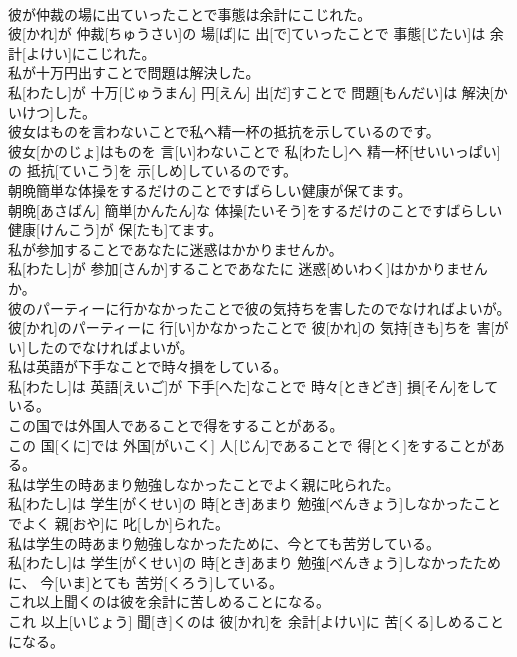 \documentclass[8pt]{extreport}
\begin{document}
\begin{CJK}{UTF8}{min}
\\	彼が仲裁の場に出ていったことで事態は余計にこじれた。	
\\	彼[かれ]が 仲裁[ちゅうさい]の 場[ば]に 出[で]ていったことで 事態[じたい]は 余計[よけい]にこじれた。
\\	私が十万円出すことで問題は解決した。	
\\	私[わたし]が 十万[じゅうまん] 円[えん] 出[だ]すことで 問題[もんだい]は 解決[かいけつ]した。
\\	彼女はものを言わないことで私へ精一杯の抵抗を示しているのです。	
\\	彼女[かのじょ]はものを 言[い]わないことで 私[わたし]へ 精一杯[せいいっぱい]の 抵抗[ていこう]を 示[しめ]しているのです。
\\	朝晩簡単な体操をするだけのことですばらしい健康が保てます。	
\\	朝晩[あさばん] 簡単[かんたん]な 体操[たいそう]をするだけのことですばらしい 健康[けんこう]が 保[たも]てます。
\\	私が参加することであなたに迷惑はかかりませんか。	
\\	私[わたし]が 参加[さんか]することであなたに 迷惑[めいわく]はかかりませんか。
\\	彼のパーティーに行かなかったことで彼の気持ちを害したのでなければよいが。	
\\	彼[かれ]のパーティーに 行[い]かなかったことで 彼[かれ]の 気持[きも]ちを 害[がい]したのでなければよいが。
\\	私は英語が下手なことで時々損をしている。	
\\	私[わたし]は 英語[えいご]が 下手[へた]なことで 時々[ときどき] 損[そん]をしている。
\\	この国では外国人であることで得をすることがある。	
\\	この 国[くに]では 外国[がいこく] 人[じん]であることで 得[とく]をすることがある。
\\	私は学生の時あまり勉強しなかったことでよく親に叱られた。	
\\	私[わたし]は 学生[がくせい]の 時[とき]あまり 勉強[べんきょう]しなかったことでよく 親[おや]に 叱[しか]られた。
\\	私は学生の時あまり勉強しなかったために、今とても苦労している。	
\\	私[わたし]は 学生[がくせい]の 時[とき]あまり 勉強[べんきょう]しなかったために、 今[いま]とても 苦労[くろう]している。
\\	これ以上聞くのは彼を余計に苦しめることになる。	
\\	これ 以上[いじょう] 聞[き]くのは 彼[かれ]を 余計[よけい]に 苦[くる]しめることになる。

\end{CJK}
\end{document}

